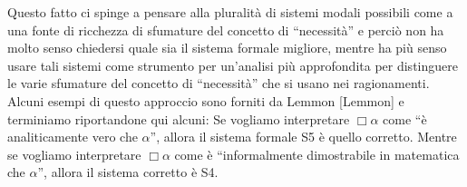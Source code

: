 \documentclass[a4paper, titlepage, 12pt]{report}
\begin{document}
Questo fatto ci spinge a pensare alla pluralità di sistemi modali possibili
come a una fonte di ricchezza di sfumature del concetto di ``necessità'' e perciò non ha molto
senso chiedersi quale sia il sistema formale migliore, mentre ha più senso usare tali sistemi
come strumento per un'analisi più approfondita per distinguere le varie sfumature del concetto
di ``necessità'' che si usano nei ragionamenti.
Alcuni esempi di questo approccio sono forniti da Lemmon [Lemmon] e terminiamo riportandone qui alcuni:
Se vogliamo interpretare $\Box \alpha$ come ``è analiticamente vero che $\alpha$'', allora il sistema
formale S5 è quello corretto. Mentre se vogliamo interpretare $\Box \alpha$ come
è ``informalmente dimostrabile in matematica che $\alpha$'', allora il sistema corretto è S4.
\end{document}
